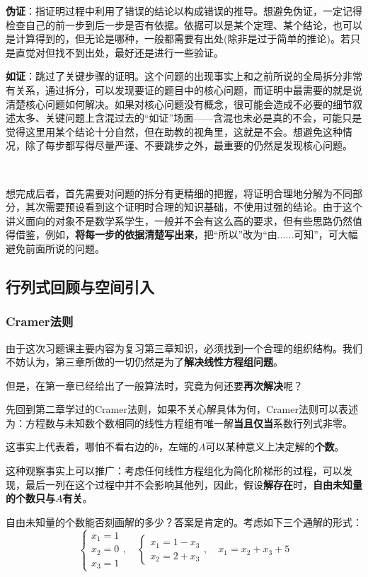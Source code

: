 \documentclass[a4paper,UTF8,fontset=windows]{ctexart}
\begin{document}
\textbf{伪证}：指证明过程中利用了错误的结论以构成错误的推导。想避免伪证，一定记得检查自己的前一步到后一步是否有依据。依据可以是某个定理、某个结论，也可以是计算得到的，但无论是哪种，一般都需要有出处(除非是过于简单的推论)。若只是直觉对但找不到出处，最好还是进行一些验证。

\textbf{如证}：跳过了关键步骤的证明。这个问题的出现事实上和之前所说的全局拆分非常有关系，通过拆分，可以发现要证的题目中的核心问题，而证明中最需要的就是说清楚核心问题如何解决。如果对核心问题没有概念，很可能会造成不必要的细节叙述太多、关键问题上含混过去的``如证''场面——含混也未必是真的不会，可能只是觉得这里用某个结论十分自然，但在助教的视角里，这就是不会。想避免这种情况，除了每步都写得尽量严谨、不要跳步之外，最重要的仍然是发现核心问题。

\

想完成后者，首先需要对问题的拆分有更精细的把握，将证明合理地分解为不同部分，其次需要预设看到这个证明时合理的知识基础，不使用过强的结论。由于这个讲义面向的对象不是数学系学生，一般并不会有这么高的要求，但有些思路仍然值得借鉴，例如，\textbf{将每一步的依据清楚写出来}，把``所以''改为``由......可知''，可大幅避免前面所说的问题。

\subsection{行列式回顾与空间引入}
\subsubsection{Cramer法则}
由于这次习题课主要内容为复习第三章知识，必须找到一个合理的组织结构。我们不妨认为，第三章所做的一切仍然是为了\textbf{解决线性方程组问题}。

但是，在第一章已经给出了一般算法时，究竟为何还要\textbf{再次解决}呢？

先回到第二章学过的Cramer法则，如果不关心解具体为何，Cramer法则可以表述为：方程数与未知数个数相同的线性方程组有唯一解\textbf{当且仅当}系数行列式非零。

这事实上代表着，哪怕不看右边的$b$，左端的$A$可以某种意义上决定解的\textbf{个数}。

这种观察事实上可以推广：考虑任何线性方程组化为简化阶梯形的过程，可以发现，最后一列在这个过程中并不会影响其他列，因此，假设\textbf{解存在}时，\textbf{自由未知量的个数只与$A$有关}。

自由未知量的个数能否刻画解的多少？答案是肯定的。考虑如下三个通解的形式：
$$\begin{cases}x_1=1\\x_2=0\\x_3=1\end{cases},\quad\begin{cases}x_1=1-x_3\\x_2=2+x_3\end{cases},\quad x_1=x_2+x_3+5$$
\end{document}
